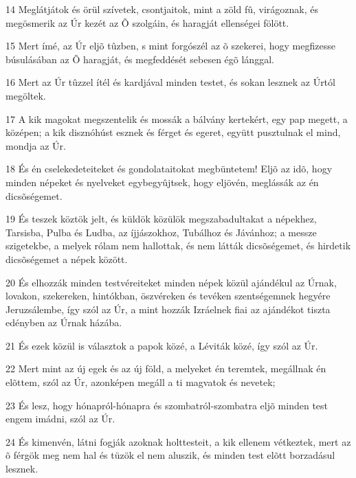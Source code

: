 \par 14 Meglátjátok és örül szívetek, csontjaitok, mint a zöld fû, virágoznak, és megösmerik az Úr kezét az Õ szolgáin, és haragját ellenségei fölött.
\par 15 Mert ímé, az Úr eljõ tûzben, s mint forgószél az õ szekerei, hogy megfizesse búsulásában az Õ haragját, és megfeddését sebesen égõ lánggal.
\par 16 Mert az Úr tûzzel ítél és kardjával minden testet, és sokan lesznek az Úrtól megöltek.
\par 17 A kik magokat megszentelik és mossák a bálvány kertekért, egy pap megett, a középen; a kik disznóhúst esznek és férget és egeret, együtt pusztulnak el mind, mondja az Úr.
\par 18 És én cselekedeteiteket és gondolataitokat megbüntetem! Eljõ az idõ, hogy minden népeket és nyelveket egybegyûjtsek, hogy eljövén, meglássák az én dicsõségemet.
\par 19 És teszek köztök jelt, és küldök közülök megszabadultakat a népekhez, Tarsisba, Pulba és Ludba, az íjjászokhoz, Tubálhoz és Jávánhoz; a messze szigetekbe, a melyek rólam nem hallottak, és nem látták dicsõségemet, és hirdetik dicsõségemet a népek között.
\par 20 És elhozzák minden testvéreiteket minden népek közül ajándékul az Úrnak, lovakon, szekereken, hintókban, öszvéreken és tevéken szentségemnek hegyére Jeruzsálembe, így szól az Úr, a mint hozzák Izráelnek fiai az ajándékot tiszta edényben az Úrnak házába.
\par 21 És ezek közül is választok a papok közé, a Léviták közé, így szól az Úr.
\par 22 Mert mint az új egek és az új föld, a melyeket én teremtek, megállnak én elõttem, szól az Úr, azonképen megáll a ti magvatok és nevetek;
\par 23 És lesz, hogy hónapról-hónapra és szombatról-szombatra eljõ minden test engem imádni, szól az Úr.
\par 24 És kimenvén, látni fogják azoknak holttesteit, a kik ellenem vétkeztek, mert az õ férgök meg  nem hal és tüzök el nem aluszik, és minden test elõtt borzadásul lesznek.


